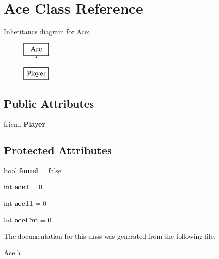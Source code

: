 \hypertarget{class_ace}{}\section{Ace Class Reference}
\label{class_ace}
Inheritance diagram for Ace\+:\begin{figure}[H]
\begin{center}
\leavevmode
\includegraphics[height=2.000000cm]{class_ace}
\end{center}
\end{figure}
\subsection*{Public Attributes}
\begin{DoxyCompactItemize}
\item 
\mbox{\label{class_ace_ac56aeb2d187a6ee828ba267573b59c8a}} 
friend {\bfseries Player}
\end{DoxyCompactItemize}
\subsection*{Protected Attributes}
\begin{DoxyCompactItemize}
\item 
\mbox{\label{class_ace_aba01e6573ba4d46bc57a01a41fd6c1f6}} 
bool {\bfseries found} = false
\item 
\mbox{\label{class_ace_a024e3775bd0310bda363956aaf8bcc78}} 
int {\bfseries ace1} = 0
\item 
\mbox{\label{class_ace_a7608750e22adc3afddf6d7966d7e8a07}} 
int {\bfseries ace11} = 0
\item 
\mbox{\label{class_ace_a79d1888b6e4baadfecc76a85e0005278}} 
int {\bfseries ace\+Cnt} = 0
\end{DoxyCompactItemize}


The documentation for this class was generated from the following file\+:\begin{DoxyCompactItemize}
\item 
Ace.\+h\end{DoxyCompactItemize}

